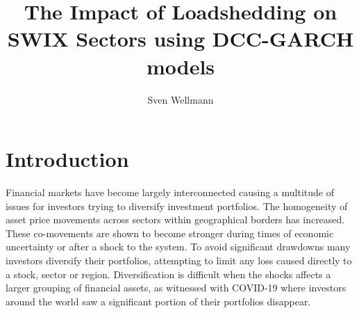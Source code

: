 \documentclass[11pt,preprint, authoryear]{elsarticle}
\numberwithin{equation}{section}
\numberwithin{figure}{section}
\numberwithin{table}{section}
\begin{document}
\begin{frontmatter}  %

\title{The Impact of Loadshedding on SWIX Sectors using DCC-GARCH
models}





\author[Add1]{Sven Wellmann}





\address[Add1]{Stellenbosch University, Stellenbosch, South Africa}



\vspace{1cm}





\vspace{0.5cm}

\end{frontmatter}



\pagestyle{fancy}
\chead{}
\rhead{}
\lfoot{}
\lhead{}
\cfoot{}


\headsep 35pt %




\hypertarget{introduction}{%
\section{\texorpdfstring{Introduction
\label{Introduction}}{Introduction }}\label{introduction}}

Financial markets have become largely interconnected causing a multitude
of issues for investors trying to diversify investment portfolios. The
homogeneity of asset price movements across sectors within geographical
borders has increased. These co-movements are shown to become stronger
during times of economic uncertainty or after a shock to the system. To
avoid significant drawdowns many investors diversify their portfolios,
attempting to limit any loss caused directly to a stock, sector or
region. Diversification is difficult when the shocks affects a larger
grouping of financial assets, as witnessed with COVID-19 where investors
around the world saw a significant portion of their portfolios
disappear.
\end{document}
